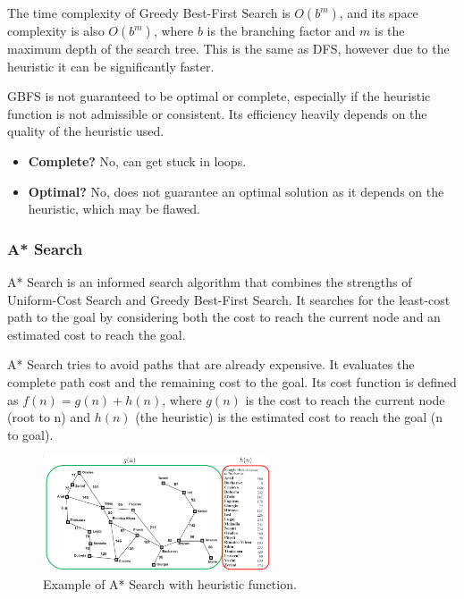 \documentclass[
../../EiKI_Summary.tex,
]
{subfiles}
\begin{document}
 The time complexity of Greedy Best-First Search is $O(b^m)$, and its space complexity is also $O(b^m)$, where $b$ is the branching factor and $m$ is the maximum depth of the search tree. This is the same as DFS, however due to the heuristic it can be significantly faster.

GBFS is not guaranteed to be optimal or complete, especially if the heuristic function is not admissible or consistent. Its efficiency heavily depends on the quality of the heuristic used.

\begin{itemize}
    \item \textbf{Complete?} No, can get stuck in loops.
    \item \textbf{Optimal?} No, does not guarantee an optimal solution as it depends on the heuristic, which may be flawed.
\end{itemize}


\subsubsection{A* Search}
\begin{defbox}
    [Definition]
    A* Search is an informed search algorithm that combines the strengths of Uniform-Cost Search and Greedy Best-First Search. It searches for the least-cost path to the goal by considering both the cost to reach the current node and an estimated cost to reach the goal.
\end{defbox}

A* Search tries to avoid paths that are already expensive. It evaluates the complete path cost and the remaining cost to the goal. Its cost function is defined as $f(n) = g(n) + h(n)$, where $g(n)$ is the cost to reach the current node (root to n) and $h(n)$ (the heuristic) is the estimated cost to reach the goal (n to goal).

\begin{figure}[htp]
    \centering
    \includegraphics[width=0.6\textwidth]{Pics/03/AStarSearchExample.png}
    \caption{Example of A* Search with heuristic function.}
\end{figure}
\end{document}

